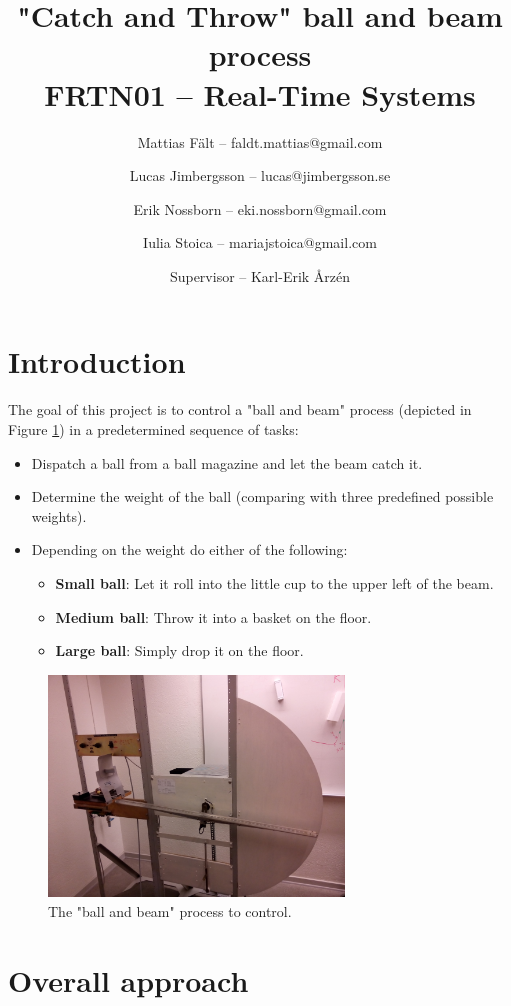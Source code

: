 \documentclass{article}
\title{"Catch and Throw" ball and beam process\\FRTN01 -- Real-Time Systems}
\author{
Mattias Fält -- faldt.mattias@gmail.com
\and
Lucas Jimbergsson -- lucas@jimbergsson.se
\and
Erik Nossborn -- eki.nossborn@gmail.com
\and
Iulia Stoica -- mariajstoica@gmail.com
\and
\and
Supervisor -- Karl-Erik Årz\'{e}n
}
\begin{document}
\maketitle
\newpage

\tableofcontents
\newpage

\section{Introduction}
\label{sec:introduction}
The goal of this project is to control a "ball and beam" process (depicted in Figure \ref{fig:process}) in a predetermined sequence of tasks:
\begin{itemize}
\item Dispatch a ball from a ball magazine and let the beam catch it.
\item Determine the weight of the ball (comparing with three predefined possible weights).
\item Depending on the weight do either of the following:
\begin{itemize}
\item \textbf{Small ball}: Let it roll into the little cup to the upper left of the beam.
\item \textbf{Medium ball}: Throw it into a basket on the floor.
\item \textbf{Large ball}: Simply drop it on the floor.
\end{itemize}
\end{itemize}
\begin{figure}
\centering
\includegraphics[width=0.7\textwidth]{figures/process_fig.jpg}
\caption{The "ball and beam" process to control.}\label{fig:process}
\end{figure}

\section{Overall approach}

\end{document}
